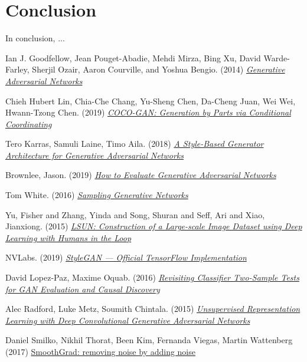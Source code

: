 \documentclass{article}
\begin{document}
        \section{Conclusion}
        In conclusion, ...
        
        
\newpage
\begin{thebibliography}{9}
        Ian J. Goodfellow, Jean Pouget-Abadie, Mehdi Mirza, Bing Xu, David Warde-Farley, Sherjil Ozair, Aaron Courville, and Yoshua Bengio. (2014)
        \href{https://papers.nips.cc/paper/2014/file/5ca3e9b122f61f8f06494c97b1afccf3-Paper.pdf}{\textit{Generative Adversarial Networks} }

        Chieh Hubert Lin, Chia-Che Chang, Yu-Sheng Chen, Da-Cheng Juan, Wei Wei, Hwann-Tzong Chen. (2019)
        \href{https://arxiv.org/pdf/1904.00284.pdf}{\textit{COCO-GAN: Generation by Parts via Conditional Coordinating} }

        Tero Karras, Samuli Laine, Timo Aila. (2018)
        \href{https://arxiv.org/pdf/1812.04948.pdf}{\textit{A Style-Based Generator Architecture for Generative Adversarial Networks} }

        Brownlee, Jason. (2019)
        \href{https://machinelearningmastery.com/how-to-evaluate-generative-adversarial-networks/}{\textit{How to Evaluate Generative Adversarial Networks}}

        Tom White. (2016)
        \href{https://arxiv.org/pdf/1609.04468.pdf}{\textit{Sampling Generative Networks} }

        Yu, Fisher and Zhang, Yinda and Song, Shuran and Seff, Ari and Xiao, Jianxiong. (2015)
        \href{https://arxiv.org/pdf/1506.03365.pdf}{\textit{LSUN: Construction of a Large-scale Image Dataset using Deep Learning with Humans in the Loop}}

        NVLabs. (2019) \href{https://github.com/NVlabs/stylegan}{\textit{StyleGAN — Official TensorFlow Implementation}}

        David Lopez-Paz, Maxime Oquab. (2016)
        \href{https://research.fb.com/wp-content/uploads/2017/04/neural_tests.pdf?}{\textit{Revisiting Classifier Two-Sample Tests for GAN Evaluation and Causal Discovery}}

        Alec Radford, Luke Metz, Soumith Chintala. (2015)
        \href{https://arxiv.org/pdf/1511.06434.pdf}{\textit{Unsupervised Representation Learning with Deep Convolutional Generative Adversarial Networks}}

        Daniel Smilko, Nikhil Thorat, Been Kim, Fernanda Viegas, Martin Wattenberg (2017)
        \href{https://arxiv.org/pdf/1706.03825.pdf}{SmoothGrad: removing noise by adding noise}

    \end{thebibliography}
    \newpage
\end{document}
